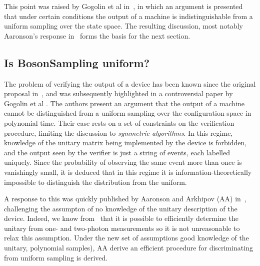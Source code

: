 This point was raised by Gogolin et al in~\cite{gogolin}, in which an argument
is presented that under certain conditions the output of a \bosonsampling{}
machine is indistinguishable from a uniform sampling over the state space. The
resulting discussion, most notably Aaronson's response in~\cite{notuniform}
forms the basis for the next section.

\subsection{Is BosonSampling uniform?}
\label{sec:RStar}
The problem of verifying the output of a \bosonsampling{} device has been known
since the original proposal in~\cite{bosonsampling}, and was subsequently
highlighted in a controversial paper by Gogolin et al \cite{gogolin}. The
authors present an argument that the output of a \bosonsampling{} machine cannot
be distinguished from a uniform sampling over the configuration space in
polynomial time. Their case rests on a set of constraints on the verification
procedure, limiting the discussion to \emph{symmetric algorithms}. In this
regime, knowledge of the unitary matrix being implemented by the device is
forbidden, and the output seen by the verifier is just a string of events, each
labelled uniquely. Since the probability of observing the same event more than
once is vanishingly small, it is deduced that in this regime it is
information-theoretically impossible to distinguish the \bosonsampling{}
distribution from the uniform.

A response to this was quickly published by Aaronson and Arkhipov (AA)
in~\cite{notuniform}, challenging the assumpton of no knowledge of the unitary
description of the device. Indeed, we know from~\cite{sst} that it is possible
to efficiently determine the unitary from one- and two-photon measurements so it
is not unreasonable to relax this assumption. Under the new set of assumptions 
good knowledge of the unitary, polynomial samples), AA derive an efficient
procedure for discriminating \bosonsampling{} from uniform sampling is derived.


